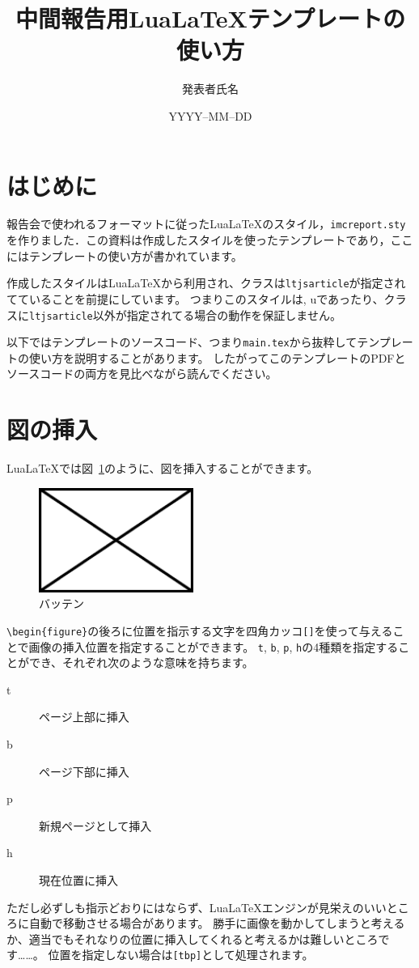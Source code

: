 \documentclass[10pt,a4j,twocolumn]{ltjsarticle}
\title{中間報告用Lua\LaTeX テンプレートの使い方} %
\author{発表者氏名}                              %
\date{YYYY--MM--DD}                              %
\begin{document}
\maketitle

\section{はじめに}

報告会で使われるフォーマットに従ったLua\LaTeX のスタイル，\verb|imcreport.sty|を作りました．この資料は作成したスタイルを使ったテンプレートであり，ここにはテンプレートの使い方が書かれています。

作成したスタイルはLua\LaTeX から利用され、クラスは\verb|ltjsarticle|が指定されてていることを前提にしています。
つまりこのスタイルは\pLaTeX, u\pLaTeX であったり、クラスに\verb|ltjsarticle|以外が指定されてる場合の動作を保証しません。

以下ではテンプレートのソースコード、つまり\verb|main.tex|から抜粋してテンプレートの使い方を説明することがあります。
したがってこのテンプレートのPDFとソースコードの両方を見比べながら読んでください。

\section{図の挿入}

Lua\LaTeX では図~\ref{バッテンのラベル}のように、図を挿入することができます。
\begin{figure}[bp]
  \centering
  \includegraphics[width=0.45\textwidth]{./sample_figure.pdf}
  \caption{バッテン}
  \label{バッテンのラベル}
\end{figure}
\verb|\begin{figure}|の後ろに位置を指示する文字を四角カッコ\verb|[]|を使って与えることで画像の挿入位置を指定することができます。
\verb|t|, \verb|b|, \verb|p|, \verb|h|の4種類を指定することができ、それぞれ次のような意味を持ちます。
\begin{description}
  \item[t] ページ上部に挿入
  \item[b] ページ下部に挿入
  \item[p] 新規ページとして挿入
  \item[h] 現在位置に挿入
\end{description}
ただし必ずしも指示どおりにはならず、Lua\LaTeX エンジンが見栄えのいいところに自動で移動させる場合があります。
勝手に画像を動かしてしまうと考えるか、適当でもそれなりの位置に挿入してくれると考えるかは難しいところです……。
位置を指定しない場合は\verb|[tbp]|として処理されます。
\end{document}
